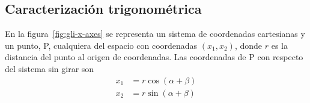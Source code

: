 \subsection{Caracterización trigonométrica}
En la figura~\ref{fig:gli-x-axes} se representa un sistema de coordenadas
cartesianas\footnotemark{} y un punto, P, cualquiera del espacio con
coordenadas $(x_1,x_2)$, donde $r$ es la distancia del punto al origen de
coordenadas.
Las coordenadas de P con respecto del sistema sin girar son
\begin{subequations}
  \begin{align}\label{eq:gli-coordxuno}
    x_1 &= r \cos(\alpha+\beta)\\
    \label{eq:gli-coordxdos}
    x_2 &= r \sin(\alpha+\beta)
  \end{align}
\end{subequations}
